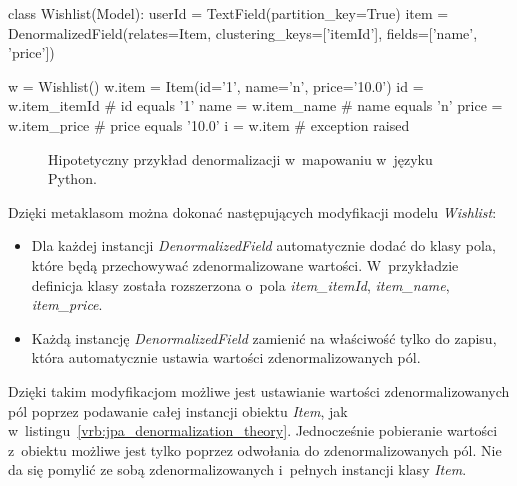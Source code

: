 \begin{verbbox}
	class Wishlist(Model):
	    userId = TextField(partition_key=True)
	    item = DenormalizedField(relates=Item, 
	                             clustering_keys=['itemId'], 
	                             fields=['name', 'price'])

	w = Wishlist()
	w.item = Item(id='1', name='n', price='10.0')
	id = w.item_itemId    # id equals '1'
	name = w.item_name    # name equals 'n'
	price = w.item_price  # price equals '10.0'
	i = w.item            # exception raised
\end{verbbox}

\begin{figure}[ht!]
	\centering
	\theverbbox
	\caption{Hipotetyczny przykład denormalizacji w~mapowaniu w~języku Python.}
	\label{vrb:sql_alchemy_like_denormalization}
\end{figure}

Dzięki metaklasom można dokonać następujących modyfikacji modelu \emph{Wishlist}:

\begin{itemize}
	\item Dla każdej instancji \emph{DenormalizedField} automatycznie dodać do klasy pola, które będą przechowywać zdenormalizowane wartości. W~przykładzie definicja klasy została rozszerzona o~pola \emph{item\_itemId}, \emph{item\_name}, \emph{item\_price}.
	\item Każdą instancję \emph{DenormalizedField} zamienić na właściwość tylko do zapisu, która automatycznie ustawia wartości zdenormalizowanych pól.
\end{itemize}

Dzięki takim modyfikacjom możliwe jest ustawianie wartości zdenormalizowanych pól poprzez podawanie całej instancji obiektu \emph{Item}, jak w~listingu~\ref{vrb:jpa_denormalization_theory}. Jednocześnie pobieranie wartości z~obiektu możliwe jest tylko poprzez odwołania do zdenormalizowanych pól. Nie da się pomylić ze sobą zdenormalizowanych i~pełnych instancji klasy \emph{Item}.